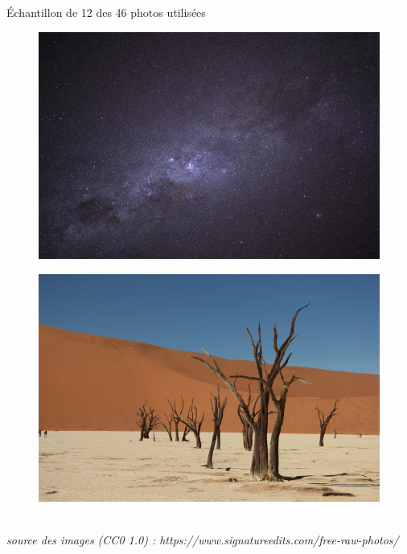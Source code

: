 \documentclass[xcolor=dvipsnames]{beamer}
\begin{document}
\begin{frame}{Échantillon de 12 des 46 photos utilisées}
\begin{minipage}{.23\textwidth}
\begin{figure}
        \end{figure}
        \begin{figure}
            \includegraphics[width=1\linewidth]{photos_utilises/27.jpg}
        \end{figure}
        \begin{figure}
            \includegraphics[width=1\linewidth]{photos_utilises/41.jpg}
        \end{figure}
    \end{minipage}
    \hfill
    \vspace{0.1cm}
    \textit{\tiny \\ \centering source des images (CC0 1.0) : https://www.signatureedits.com/free-raw-photos/}


\end{frame}
\end{document}
